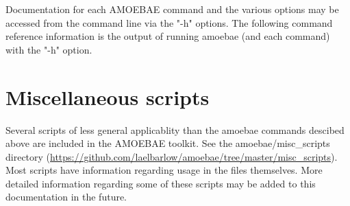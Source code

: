 \documentclass[12pt,letterpaper]{article}
\begin{document}
\begin{linenumbers}
Documentation for each AMOEBAE command and the various options may be accessed
from the command line via the "-h" options. The following command reference
information is the output of running amoebae (and each command) with the "-h"
option.




\section{Miscellaneous scripts}

Several scripts of less general applicablity than the amoebae commands descibed
above are included in the AMOEBAE toolkit. See the amoebae/misc\_scripts
directory
(\url{https://github.com/laelbarlow/amoebae/tree/master/misc_scripts}). Most
scripts have information regarding usage in the files themselves. More detailed
information regarding some of these scripts may be added to this documentation
in the future.



\printglossaries %

\newpage
\end{linenumbers}

 
\begin{multicols}{2}
{\footnotesize %
}
\end{multicols}
\end{document}
